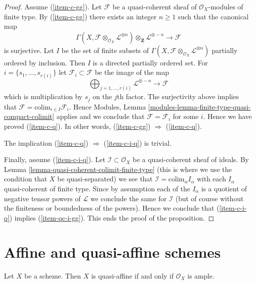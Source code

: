 \begin{proof}
\medskip\noindent
Assume (\ref{item-c-gg}). Let $\mathcal{F}$ be a quasi-coherent
sheaf of $\mathcal{O}_X$-modules of finite type.
By (\ref{item-c-gg}) there exists an integer $n \geq 1$ such that
the canonical map
$$
\Gamma(X, \mathcal{F} \otimes_{\mathcal{O}_X} \mathcal{L}^{\otimes n})
\otimes_{\mathbf{Z}} \mathcal{L}^{\otimes -n}
\longrightarrow
\mathcal{F}
$$
is surjective. Let $I$ be the set of finite subsets of
$\Gamma(X, \mathcal{F} \otimes_{\mathcal{O}_X} \mathcal{L}^{\otimes n})$
partially ordered by inclusion. Then $I$ is a directed partially ordered set.
For $i = \{s_1, \ldots, s_{r(i)}\}$ let $\mathcal{F}_i \subset \mathcal{F}$
be the image of the map
$$
\bigoplus\nolimits_{j = 1, \ldots, r(i)} \mathcal{L}^{\otimes -n}
\longrightarrow
\mathcal{F}
$$
which is multiplication by $s_j$ on the $j$th factor. The surjectivity above
implies that $\mathcal{F} = \text{colim}_{i \in I} \mathcal{F}_i$.
Hence Modules, Lemma \ref{modules-lemma-finite-type-quasi-compact-colimit}
applies and we conclude that
$\mathcal{F} = \mathcal{F}_i$ for some $i$.
Hence we have proved (\ref{item-c-q}). In other words,
(\ref{item-c-gg}) $\Rightarrow$ (\ref{item-c-q}).

\medskip\noindent
The implication (\ref{item-c-q}) $\Rightarrow$ (\ref{item-c-i-q}) is trivial.

\medskip\noindent
Finally, assume (\ref{item-c-i-q}).
Let $\mathcal{I} \subset \mathcal{O}_X$ be a quasi-coherent sheaf
of ideals. By Lemma \ref{lemma-quasi-coherent-colimit-finite-type}
(this is where we use the condition that $X$ be quasi-separated)
we see that $\mathcal{I} = \text{colim}_\alpha I_\alpha$ with
each $I_\alpha$ quasi-coherent of finite type. Since by assumption each of
the $I_\alpha$ is a quotient of negative tensor powers of
$\mathcal{L}$ we conclude the same for $\mathcal{I}$ (but of course
without the finiteness or boundedness of the powers). Hence
we conclude that (\ref{item-c-i-q}) implies (\ref{item-qc-i-gg}).
This ends the proof of the proposition.
\end{proof}




\section{Affine and quasi-affine schemes}
\label{section-affine-quasi-affine}

\begin{lemma}
\label{lemma-quasi-affine-O-ample}
Let $X$ be a scheme.
Then $X$ is quasi-affine if and only if $\mathcal{O}_X$ is ample.
\end{lemma}


